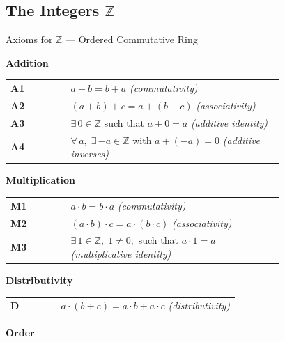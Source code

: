 \subsection*{The Integers $\mathbb{Z}$}

\begin{axiombox}{Axioms for $\mathbb{Z}$ — Ordered Commutative Ring}

\medskip
\noindent\textbf{Addition}

\medskip
\begin{tabular}{@{} l p{0.78\linewidth} @{}}
\textbf{A1} & $a + b = b + a$ \hfill\textit{(commutativity)} \\[3pt]
\textbf{A2} & $(a + b) + c = a + (b + c)$ \hfill\textit{(associativity)} \\[3pt]
\textbf{A3} & $\exists\, 0 \in \mathbb{Z}$ such that $a + 0 = a$
             \hfill\textit{(additive identity)} \\[3pt]
\textbf{A4} & $\forall\, a,\; \exists\, {-a} \in \mathbb{Z}$ with
             $a + (-a) = 0$
             \hfill\textit{(additive inverses)} \\[6pt]
\end{tabular}

\noindent\textbf{Multiplication}

\medskip
\begin{tabular}{@{} l p{0.78\linewidth} @{}}
\textbf{M1} & $a \cdot b = b \cdot a$ \hfill\textit{(commutativity)} \\[3pt]
\textbf{M2} & $(a \cdot b) \cdot c = a \cdot (b \cdot c)$
             \hfill\textit{(associativity)} \\[3pt]
\textbf{M3} & $\exists\, 1 \in \mathbb{Z},\; 1 \neq 0,$ such that $a \cdot 1 = a$
             \hfill\textit{(multiplicative identity)} \\[6pt]
\end{tabular}

\noindent\textbf{Distributivity}

\medskip
\begin{tabular}{@{} l p{0.78\linewidth} @{}}
\textbf{D} & $a \cdot (b + c) = a \cdot b + a \cdot c$
            \hfill\textit{(distributivity)} \\[6pt]
\end{tabular}

\noindent\textbf{Order}


\end{axiombox}
